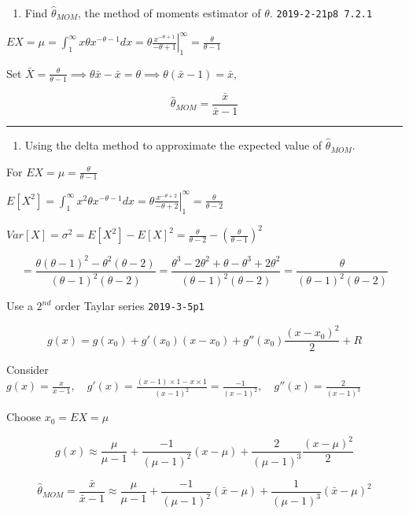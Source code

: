 \documentclass[12pt,]{article}
\providecommand{\tightlist}{%
  \setlength{\itemsep}{0pt}\setlength{\parskip}{0pt}}
\begin{document}
\begin{enumerate}
\def\labelenumi{\alph{enumi}.}
\tightlist
\item
  \textcolor[rgb]{0.5,0.5,0.5}{Find $\hat\theta_{MOM}$, the method of moments estimator of $\theta$.}
  \texttt{2019-2-21p8\ 7.2.1}
\end{enumerate}

\(EX=\mu=\int_1^{\infty}x\theta x^{-\theta-1}dx=\left.\theta\frac{x^{-\theta+1}}{-\theta+1}\right|_1^{\infty}=\frac\theta{\theta-1}\)

Set
\(\bar X=\frac\theta{\theta-1}\implies\theta\bar x-\bar x=\theta\implies\theta(\bar x-1)=\bar x\),

\[\hat\theta_{MOM}=\frac{\bar x}{\bar x-1}\]

\begin{center}\rule{0.5\linewidth}{\linethickness}\end{center}

\begin{enumerate}
\def\labelenumi{\alph{enumi}.}
\setcounter{enumi}{1}
\tightlist
\item
  \textcolor[rgb]{0.5,0.5,0.5}{Using the delta method to approximate the expected value of $\hat\theta_{MOM}$.}
\end{enumerate}

For \(EX=\mu=\frac\theta{\theta-1}\)

\(E[X^2]=\int_1^{\infty}x^2\theta x^{-\theta-1}dx=\left.\theta\frac{x^{-\theta+2}}{-\theta+2}\right|_1^{\infty}=\frac\theta{\theta-2}\)

\(Var[X]=\sigma^2=E[X^2]-E[X]^2=\frac\theta{\theta-2}-(\frac\theta{\theta-1})^2\)

\[=\frac{\theta(\theta-1)^2-\theta^2(\theta-2)}{(\theta-1)^2(\theta-2)}=\frac{\theta^3-2\theta^2+\theta-\theta^3+2\theta^2}{(\theta-1)^2(\theta-2)}=\frac{\theta}{(\theta-1)^2(\theta-2)}\]

Use a \(2^{nd}\) order Taylar series \texttt{2019-3-5p1}

\[g(x)=g(x_0)+g'(x_0)(x-x_0)+g''(x_0)\frac{(x-x_0)^2}2+R\]

Consider
\(g(x)=\frac{x}{x-1},\quad g'(x)=\frac{(x-1)\times1-x\times1}{(x-1)^2}=\frac{-1}{(x-1)^2},\quad g''(x)=\frac{2}{(x-1)^3}\)

Choose \(x_0=EX=\mu\)

\[g(x)\approx \frac{\mu}{\mu-1}+\frac{-1}{(\mu-1)^2}(x-\mu)+\frac{2}{(\mu-1)^3}\frac{(x-\mu)^2}2\]

\[\hat\theta_{MOM}=\frac{\bar x}{\bar x-1}\approx \frac{\mu}{\mu-1}+\frac{-1}{(\mu-1)^2}(\bar x-\mu)+\frac{1}{(\mu-1)^3}(\bar x-\mu)^2\]
\end{document}
